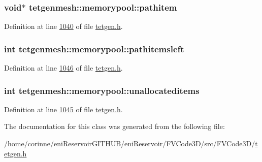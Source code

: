 \subsubsection[{\texorpdfstring{pathitem}{pathitem}}]{\setlength{\rightskip}{0pt plus 5cm}void$\ast$ tetgenmesh\+::memorypool\+::pathitem}\hypertarget{classtetgenmesh_1_1memorypool_a216794c50c477f54c516ca4fad023df1}{}\label{classtetgenmesh_1_1memorypool_a216794c50c477f54c516ca4fad023df1}


Definition at line \hyperlink{tetgen_8h_source_l01040}{1040} of file \hyperlink{tetgen_8h_source}{tetgen.\+h}.

\subsubsection[{\texorpdfstring{pathitemsleft}{pathitemsleft}}]{\setlength{\rightskip}{0pt plus 5cm}int tetgenmesh\+::memorypool\+::pathitemsleft}\hypertarget{classtetgenmesh_1_1memorypool_ad83a51d49f6e03ff38151b870a2f51dd}{}\label{classtetgenmesh_1_1memorypool_ad83a51d49f6e03ff38151b870a2f51dd}


Definition at line \hyperlink{tetgen_8h_source_l01046}{1046} of file \hyperlink{tetgen_8h_source}{tetgen.\+h}.

\subsubsection[{\texorpdfstring{unallocateditems}{unallocateditems}}]{\setlength{\rightskip}{0pt plus 5cm}int tetgenmesh\+::memorypool\+::unallocateditems}\hypertarget{classtetgenmesh_1_1memorypool_aa8a5667ab1f55ec7ef852d378871b9ee}{}\label{classtetgenmesh_1_1memorypool_aa8a5667ab1f55ec7ef852d378871b9ee}


Definition at line \hyperlink{tetgen_8h_source_l01045}{1045} of file \hyperlink{tetgen_8h_source}{tetgen.\+h}.



The documentation for this class was generated from the following file\+:\begin{DoxyCompactItemize}
\item 
/home/corinne/eni\+Reservoir\+G\+I\+T\+H\+U\+B/eni\+Reservoir/\+F\+V\+Code3\+D/src/\+F\+V\+Code3\+D/\hyperlink{tetgen_8h}{tetgen.\+h}\end{DoxyCompactItemize}
